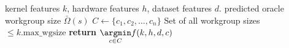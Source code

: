 \begin{algorithmic}[1]
\Require kernel features $k$, hardware features $h$, dataset features
$d$.
\Ensure predicted oracle workgroup size $\bar{\Omega}(s)$
\State $C \leftarrow \{c_1, c_2, \ldots, c_n \}$
\Comment Set of all workgroup sizes $\le k.\text{max\_wgsize}$
\State \textbf{return} $\underset{c \in C}{\argmin} f(k,h,d,c)$
\end{algorithmic}
